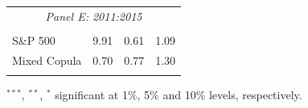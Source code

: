 \documentclass[pdf,9pt,xcolor=dvipsnames,hide notes]{beamer}
\begin{document}
\begin{frame}
\begin{threeparttable}[H]
\begin{tabularx}{\textwidth}{@{\extracolsep{\fill}}llll@{}}
		\multicolumn{4}{c}{\textit{Panel E: 2011:2015}} \\
		&       &       &       \\
		S\&P 500 & 9.91  & 0.61  & 1.09 \\
		Mixed Copula & 0.70  & 0.77  & 1.30 \\
		\multicolumn{1}{r}{} & \multicolumn{1}{r}{} & \multicolumn{1}{r}{} & \multicolumn{1}{r}{} \\
		\bottomrule
	\end{tabularx}%
	\begin{tablenotes}
		\item \scriptsize $^{\ast\ast\ast}$, $^{\ast\ast}$, $^{\ast}$  significant at 1\%, 5\% and 10\% levels, respectively.
	\end{tablenotes}
	\label{tab:table108}%
\end{threeparttable}%

\end{frame}
\end{document}

